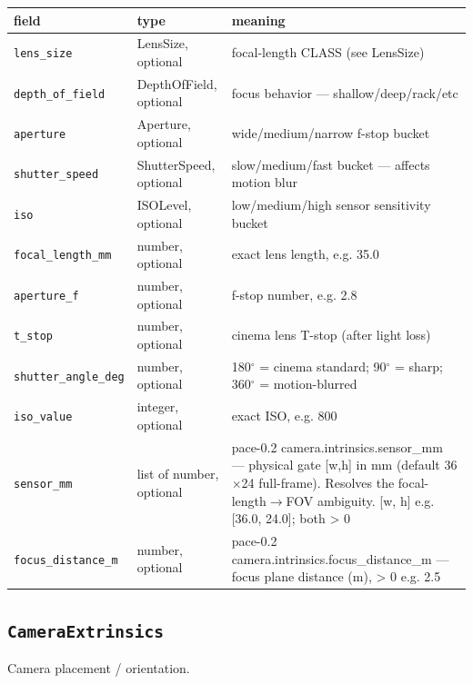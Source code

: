 \begin{longtable}{@{}R{0.24\textwidth}R{0.21\textwidth}R{0.49\textwidth}@{}}
\toprule \textbf{field} & \textbf{type} & \textbf{meaning} \\ \midrule
\endhead
\texttt{lens\_\allowbreak size} & LensSize, optional & focal-length CLASS (see LensSize) \\
\texttt{depth\_\allowbreak of\_\allowbreak field} & DepthOfField, optional & focus behavior ---\allowbreak{} shallow/\allowbreak{}deep/\allowbreak{}rack/\allowbreak{}etc \\
\texttt{aperture} & Aperture, optional & wide/\allowbreak{}medium/\allowbreak{}narrow f-stop bucket \\
\texttt{shutter\_\allowbreak speed} & ShutterSpeed, optional & slow/\allowbreak{}medium/\allowbreak{}fast bucket ---\allowbreak{} affects motion blur \\
\texttt{iso} & ISOLevel, optional & low/\allowbreak{}medium/\allowbreak{}high sensor sensitivity bucket \\
\texttt{focal\_\allowbreak length\_\allowbreak mm} & number, optional & exact lens length, e.g. 35.0 \\
\texttt{aperture\_\allowbreak f} & number, optional & f-stop number, e.g. 2.8 \\
\texttt{t\_\allowbreak stop} & number, optional & cinema lens T-stop (after light loss) \\
\texttt{shutter\_\allowbreak angle\_\allowbreak deg} & number, optional & 180$^\circ$ = cinema standard; 90$^\circ$ = sharp; 360$^\circ$ = motion-blurred \\
\texttt{iso\_\allowbreak value} & integer, optional & exact ISO, e.g. 800 \\
\texttt{sensor\_\allowbreak mm} & list of number, optional & pace-0.2 camera.intrinsics.sensor\_\allowbreak mm ---\allowbreak{} physical gate [w,h] in mm (default 36$\times$24 full-frame). Resolves the focal-length$\to$FOV ambiguity. [w, h] e.g. [36.0, 24.0]; both > 0 \\
\texttt{focus\_\allowbreak distance\_\allowbreak m} & number, optional & pace-0.2 camera.intrinsics.focus\_\allowbreak distance\_\allowbreak m ---\allowbreak{} focus plane distance (m), > 0 e.g. 2.5 \\
\bottomrule
\end{longtable}

\subsection*{\texttt{CameraExtrinsics}}
\noindent Camera placement /\allowbreak{} orientation.

